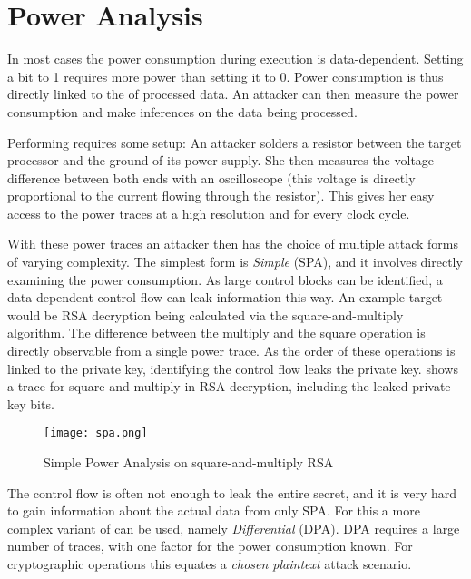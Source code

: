 \section{Power Analysis}
\label{poweranalysis}

In most cases the power consumption during execution is data-dependent.
Setting a bit to 1 requires more power than setting it to 0.
Power consumption is thus directly linked to the \hammingw{} of processed data.
An attacker can then measure the power consumption and make inferences on the data being processed.

Performing \poweranalysis{} requires some setup:
An attacker solders a resistor between the target processor and the ground of its power supply.
She then measures the voltage difference between both ends with an oscilloscope (this voltage is directly proportional to the current flowing through the resistor).
This gives her easy access to the power traces at a high resolution and for every clock cycle.

With these power traces an attacker then has the choice of multiple attack forms of varying complexity.\cite{kocher1998introduction}\cite{brier2004correlation}
The simplest form is \emph{Simple \poweranalysis{}} (SPA), and it involves directly examining the power consumption.
As large control blocks can be identified, a data-dependent control flow can leak information this way.
An example target would be RSA decryption being calculated via the square-and-multiply algorithm.
The difference between the multiply and the square operation is directly observable from a single power trace.
As the order of these operations is linked to the private key, identifying the control flow leaks the private key.
 shows a trace for square-and-multiply in RSA decryption, including the leaked private key bits.

\begin{figure}[h]
  \centering
  \texttt{[image: spa.png]}
  \caption{Simple Power Analysis on square-and-multiply RSA\cite{boehme2017netsec}}
  \label{fig:spa}
\end{figure}

The control flow is often not enough to leak the entire secret, and it is very hard to gain information about the actual data from only SPA.
For this a more complex variant of \poweranalysis{} can be used, namely \emph{Differential \poweranalysis{}} (DPA).
DPA requires a large number of traces, with one factor for the power consumption known.
For cryptographic operations this equates a \emph{chosen plaintext} attack scenario.

